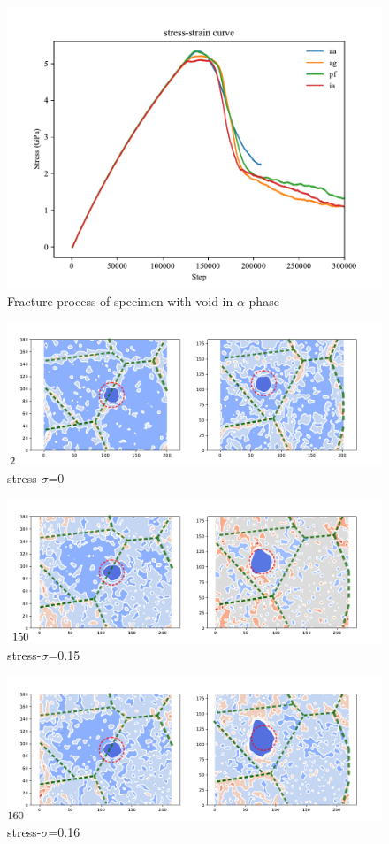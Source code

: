 \documentclass[times]{elsarticle}
\begin{document}
\begin{figure}
	\centering
	\includegraphics[width=0.7\linewidth]{img/allline}
	\caption{Fracture process of specimen with void in $\alpha$ phase}
	\label{fig:all_line}
\end{figure}

\begin{figure}
	\centering
	\includegraphics[width=0.7\linewidth]{img/frame2}
	\caption{stress-$\sigma$=0}
	\label{fig:all_line}
\end{figure}

\begin{figure}
	\centering
	\includegraphics[width=0.7\linewidth]{img/frame150}
	\caption{stress-$\sigma$=0.15}
	\label{fig:all_line}
\end{figure}

\begin{figure}
	\centering
	\includegraphics[width=0.7\linewidth]{img/frame160}
	\caption{stress-$\sigma$=0.16}
	\label{fig:all_line}
\end{figure}
\end{document}
